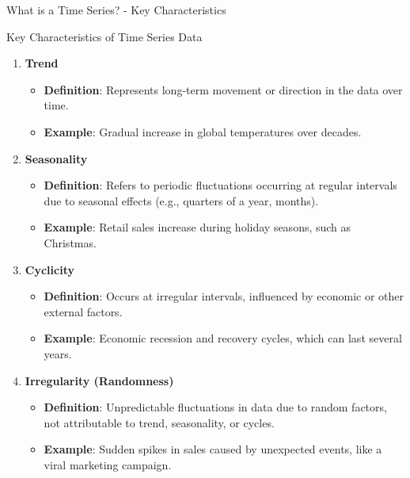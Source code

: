 \documentclass[aspectratio=169]{beamer}
\begin{document}
\begin{frame}[fragile]{What is a Time Series? - Key Characteristics}
    \begin{block}{Key Characteristics of Time Series Data}
        \begin{enumerate}
            \item \textbf{Trend}
            \begin{itemize}
                \item \textbf{Definition}: Represents long-term movement or direction in the data over time.
                \item \textbf{Example}: Gradual increase in global temperatures over decades.
            \end{itemize}

            \item \textbf{Seasonality}
            \begin{itemize}
                \item \textbf{Definition}: Refers to periodic fluctuations occurring at regular intervals due to seasonal effects (e.g., quarters of a year, months).
                \item \textbf{Example}: Retail sales increase during holiday seasons, such as Christmas.
            \end{itemize}

            \item \textbf{Cyclicity}
            \begin{itemize}
                \item \textbf{Definition}: Occurs at irregular intervals, influenced by economic or other external factors.
                \item \textbf{Example}: Economic recession and recovery cycles, which can last several years.
            \end{itemize}

            \item \textbf{Irregularity (Randomness)}
            \begin{itemize}
                \item \textbf{Definition}: Unpredictable fluctuations in data due to random factors, not attributable to trend, seasonality, or cycles.
                \item \textbf{Example}: Sudden spikes in sales caused by unexpected events, like a viral marketing campaign.
            \end{itemize}
        \end{enumerate}
    \end{block}
\end{frame}
\end{document}
